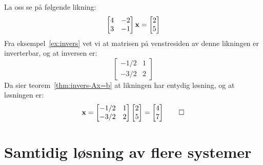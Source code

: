 \begin{ex}
La oss se på følgende likning:
\[
\begin{bmatrix}
 4 & -2 \\
 3 & -1
\end{bmatrix}
\mathbf{x}
=
\begin{bmatrix} 2 \\ 5 \end{bmatrix}
\]
Fra eksempel~\ref{ex:invers} vet vi at matrisen på venstresiden av
denne likningen er inverterbar, og at inversen er:
\[
\begin{bmatrix}
-1/2 & 1 \\
-3/2 & 2
\end{bmatrix}
\]
Da sier teorem~\ref{thm:invers-Ax=b} at likningen har entydig løsning,
og at løsningen er:
\[
\mathbf{x} =
\begin{bmatrix}
-1/2 & 1 \\
-3/2 & 2
\end{bmatrix}
\begin{bmatrix} 2 \\ 5 \end{bmatrix}
=
\begin{bmatrix} 4 \\ 7 \end{bmatrix}
\qedhere
\]
\end{ex}











\section*{Samtidig løsning av flere systemer}

